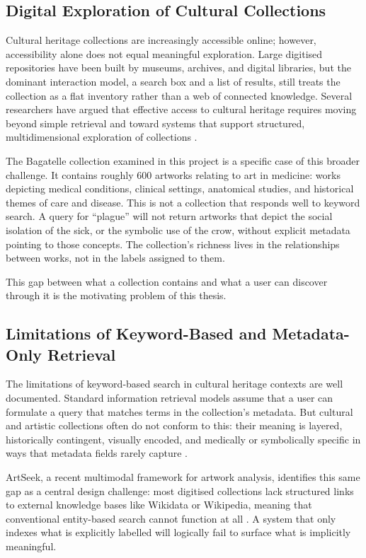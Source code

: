 \documentclass[12pt, a4paper]{article}
\begin{document}
\subsection{Digital Exploration of Cultural Collections}

Cultural heritage collections are increasingly accessible online; however, accessibility alone does
not equal meaningful exploration. Large digitised repositories have been built by museums, archives,
and digital libraries, but the dominant interaction model, a search box and a list of results, still
treats the collection as a flat inventory rather than a web of connected knowledge. Several
researchers have argued that effective access to cultural heritage requires moving beyond simple
retrieval and toward systems that support structured, multidimensional exploration of collections
\citep{shiri2015, ardissono2016}.

The Bagatelle collection examined in this project is a specific case of this broader challenge. It
contains roughly 600 artworks relating to art in medicine: works depicting medical conditions,
clinical settings, anatomical studies, and historical themes of care and disease. This is not a
collection that responds well to keyword search. A query for ``plague'' will not return artworks
that depict the social isolation of the sick, or the symbolic use of the crow, without explicit
metadata pointing to those concepts. The collection's richness lives in the relationships between
works, not in the labels assigned to them.

This gap between what a collection contains and what a user can discover through it is the
motivating problem of this thesis.

\subsection{Limitations of Keyword-Based and Metadata-Only Retrieval}

The limitations of keyword-based search in cultural heritage contexts are well documented. Standard
information retrieval models assume that a user can formulate a query that matches terms in the
collection's metadata. But cultural and artistic collections often do not conform to this: their
meaning is layered, historically contingent, visually encoded, and medically or symbolically
specific in ways that metadata fields rarely capture \citep{shiri2015}.

ArtSeek, a recent multimodal framework for artwork analysis, identifies this same gap as a central
design challenge: most digitised collections lack structured links to external knowledge bases like
Wikidata or Wikipedia, meaning that conventional entity-based search cannot function at all
\citep{fanelli2025}. A system that only indexes what is explicitly labelled will logically fail to
surface what is implicitly meaningful.
\end{document}
